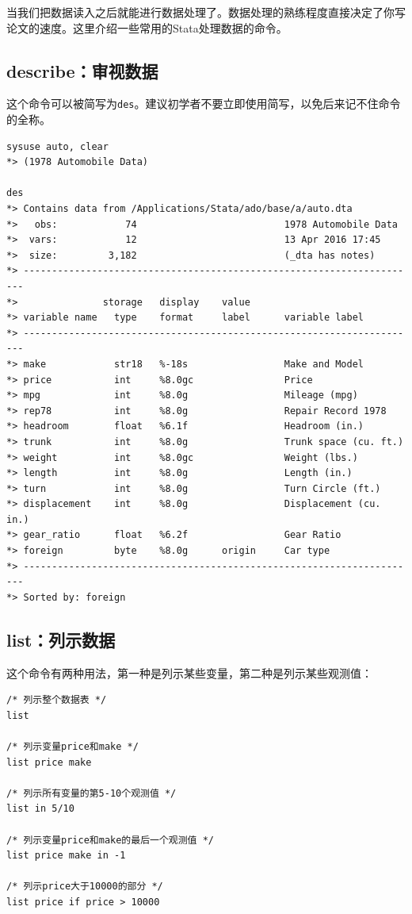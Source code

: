 当我们把数据读入之后就能进行数据处理了。数据处理的熟练程度直接决定了你写论文的速度。这里介绍一些常用的Stata处理数据的命令。

\subsection{describe：审视数据}

这个命令可以被简写为\texttt{des}。建议初学者不要立即使用简写，以免后来记不住命令的全称。

\begin{lstlisting}
sysuse auto, clear
*> (1978 Automobile Data)

des
*> Contains data from /Applications/Stata/ado/base/a/auto.dta
*>   obs:            74                          1978 Automobile Data
*>  vars:            12                          13 Apr 2016 17:45
*>  size:         3,182                          (_dta has notes)
*> ----------------------------------------------------------------------
*>               storage   display    value
*> variable name   type    format     label      variable label
*> ----------------------------------------------------------------------
*> make            str18   %-18s                 Make and Model
*> price           int     %8.0gc                Price
*> mpg             int     %8.0g                 Mileage (mpg)
*> rep78           int     %8.0g                 Repair Record 1978
*> headroom        float   %6.1f                 Headroom (in.)
*> trunk           int     %8.0g                 Trunk space (cu. ft.)
*> weight          int     %8.0gc                Weight (lbs.)
*> length          int     %8.0g                 Length (in.)
*> turn            int     %8.0g                 Turn Circle (ft.)
*> displacement    int     %8.0g                 Displacement (cu. in.)
*> gear_ratio      float   %6.2f                 Gear Ratio
*> foreign         byte    %8.0g      origin     Car type
*> ----------------------------------------------------------------------
*> Sorted by: foreign
\end{lstlisting}

\subsection{list：列示数据}

这个命令有两种用法，第一种是列示某些变量，第二种是列示某些观测值：

\begin{lstlisting}
/* 列示整个数据表 */
list

/* 列示变量price和make */
list price make

/* 列示所有变量的第5-10个观测值 */
list in 5/10

/* 列示变量price和make的最后一个观测值 */
list price make in -1

/* 列示price大于10000的部分 */
list price if price > 10000
\end{lstlisting}

